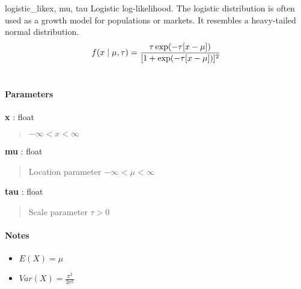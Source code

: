 \hypertarget{pymc.distributions.logistic_like}{}
\begin{funcdesc}{logistic\_like}{x, mu, tau}
Logistic log-likelihood. The logistic distribution is often used as a growth model for populations or markets. It resembles a heavy-tailed normal distribution.
\begin{gather}
\begin{split}f(x \mid \mu, \tau) = \frac{\tau \exp(-\tau[x-\mu])}{[1 + \exp(-\tau[x-\mu])]^2}\end{split}\notag\\\begin{split}\end{split}\notag
\end{gather}\paragraph{Parameters}\begin{paramlist}

\item[] \textbf{x} : float
\begin{quote}

$-\infty < x < \infty$
\end{quote}

\item[] \textbf{mu} : float
\begin{quote}

Location parameter $-\infty < \mu < \infty$
\end{quote}

\item[] \textbf{tau} : float
\begin{quote}

Scale parameter $\tau > 0$
\end{quote}
\end{paramlist}
\paragraph{Notes}
\begin{itemize}
\item {}
$E(X) = \mu$

\item {}
$Var(X) = \frac{\pi^2}{3\tau^2}$

\end{itemize}
\end{funcdesc}

